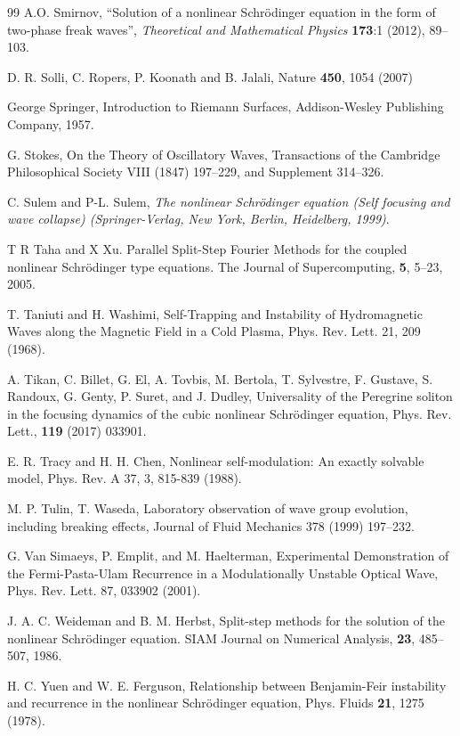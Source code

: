 \documentclass[12pt]{article}
\begin{document}
\begin{thebibliography}{99}
 A.O. Smirnov, ``Solution of a nonlinear Schrödinger equation in the form of two-phase freak waves'', \textit{Theoretical and Mathematical Physics} \textbf{173}:1 (2012),  89--103.

 D. R. Solli, C. Ropers, P. Koonath and B. Jalali, Nature {\bf 450}, 1054 (2007)

 George Springer, Introduction to Riemann Surfaces, Addison-Wesley Publishing Company, 1957.

 G. Stokes, On the Theory of Oscillatory Waves, Transactions of the Cambridge Philosophical Society VIII (1847) 197--229, and Supplement 314--326.

 C. Sulem and P-L. Sulem, {\it The nonlinear Schr\"odinger equation (Self focusing and wave collapse) (Springer-Verlag, New York, Berlin, Heidelberg, 1999)}.

 T R Taha and X Xu. Parallel Split-Step Fourier Methods for the coupled nonlinear Schr\"odinger type equations.
The Journal of Supercomputing, {\bf 5}, 5--23, 2005.

 T. Taniuti and H. Washimi, Self-Trapping and Instability of Hydromagnetic Waves along the Magnetic Field in a Cold Plasma, Phys. Rev. Lett. 21, 209 (1968).
 
 A. Tikan, C. Billet, G. El, A. Tovbis, M. Bertola, T. Sylvestre, F. Gustave, S. Randoux, G. Genty, P. Suret, and J. Dudley, Universality of the Peregrine soliton in the focusing dynamics of the cubic nonlinear Schr\"odinger equation, Phys. Rev. Lett., {\bf 119} (2017)
033901.

 E. R. Tracy and H. H. Chen, Nonlinear self-modulation: An exactly solvable model, Phys. Rev. A 37, 3, 815-839 (1988).

 M. P. Tulin, T. Waseda, Laboratory observation of wave group evolution, including breaking effects, Journal of Fluid Mechanics 378 (1999) 197--232.

 G. Van Simaeys, P. Emplit, and M. Haelterman, Experimental Demonstration of the Fermi-Pasta-Ulam Recurrence in a Modulationally Unstable Optical Wave, Phys. Rev. Lett. 87, 033902 (2001).

 J. A. C. Weideman and B. M. Herbst, Split-step methods for the solution of the nonlinear Schr\"odinger equation.
SIAM Journal on Numerical Analysis, {\bf 23}, 485--507, 1986.

 H. C. Yuen and W. E. Ferguson, Relationship between Benjamin-Feir instability and recurrence in the nonlinear Schr\"odinger equation, Phys. Fluids {\bf 21}, 1275 (1978).


\end{thebibliography}
\end{document}
